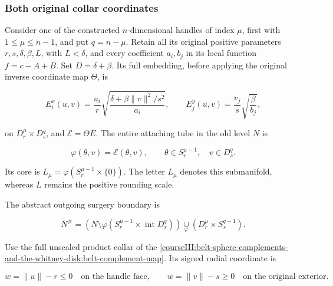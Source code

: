 \subsubsection{Both original collar coordinates}
\label{courseIII:rearranging-the-original-framed-handles:section-1.1}

Consider one of the constructed \(n\)-dimensional handles of index \(\mu\), first with \(1\leq\mu\leq n-1\), and put \(q=n-\mu\). Retain all its original positive parameters \(r,s,\delta,\beta,L\), with \(L<\delta\), and every coefficient \(a_i,b_j\) in its local function \(f=c-A+B\). Set \(D=\delta+\beta\). Its full embedding, before applying the original inverse coordinate map \(\Theta\), is

\begin{equation}
E_i^x(u,v)=\frac{u_i}{r}
 \sqrt{\frac{\delta+\beta\|v\|^2/s^2}{a_i}},
\qquad
E_j^y(u,v)=\frac{v_j}{s}\sqrt{\frac{\beta}{b_j}},
\label{courseIII:rearranging-the-original-framed-handles:eq:1.1}
\end{equation}

on \(D_r^\mu\times D_s^q\), and \(\mathcal E=\Theta E\). The entire attaching tube in the old level \(N\) is

\begin{equation}
\varphi(\theta,v)=\mathcal E(\theta,v),
\qquad \theta\in S_r^{\mu-1},\quad v\in D_s^q.
\label{courseIII:rearranging-the-original-framed-handles:eq:1.2}
\end{equation}

Its core is \(L_\mu=\varphi(S_r^{\mu-1}\times\{0\})\). The letter \(L_\mu\) denotes this submanifold, whereas \(L\) remains the positive rounding scale.

The abstract outgoing surgery boundary is

\begin{equation}
N^\#=
\left(N\setminus\varphi(S_r^{\mu-1}\times\operatorname{int}D_s^q)\right)
\underset{\varphi}{\cup}
(D_r^\mu\times S_s^{q-1}).
\label{courseIII:rearranging-the-original-framed-handles:eq:1.3}
\end{equation}

Use the full unscaled product collar of the \cref{courseIII:belt-sphere-complements-and-the-whitney-disk:belt-complement-map}. Its signed radial coordinate is

\begin{equation}
w=\|u\|-r\leq0
\quad\text{on the handle face},\qquad
w=\|v\|-s\geq0
\quad\text{on the original exterior}.
\label{courseIII:rearranging-the-original-framed-handles:eq:1.4}
\end{equation}

